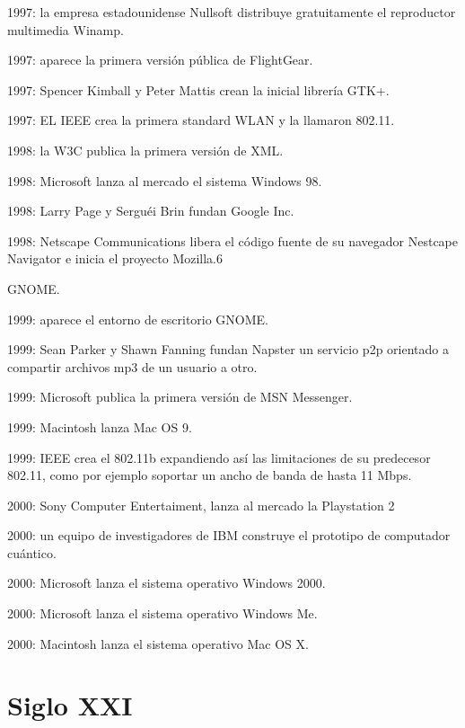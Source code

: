 \documentclass{article}
\begin{document}
{    \item 1997: la empresa estadounidense Nullsoft distribuye gratuitamente el reproductor multimedia Winamp.
    \item 1997: aparece la primera versión pública de FlightGear.
    \item 1997: Spencer Kimball y Peter Mattis crean la inicial librería GTK+.
    \item 1997: EL IEEE crea la primera standard WLAN y la llamaron 802.11.
    \item 1998: la W3C publica la primera versión de XML.
    \item 1998: Microsoft lanza al mercado el sistema Windows 98.
    \item 1998: Larry Page y Serguéi Brin fundan Google Inc.
    \item 1998: Netscape Communications libera el código fuente de su navegador Nestcape Navigator e inicia el proyecto Mozilla.6​

GNOME.

    \item 1999: aparece el entorno de escritorio GNOME.
    \item 1999: Sean Parker y Shawn Fanning fundan Napster un servicio p2p orientado a compartir archivos mp3 de un usuario a otro.
    \item 1999: Microsoft publica la primera versión de MSN Messenger.
    \item 1999: Macintosh lanza Mac OS 9.
    \item 1999: IEEE crea el 802.11b expandiendo así las limitaciones de su predecesor 802.11, como por ejemplo soportar un ancho de banda de hasta 11 Mbps.
    \item 2000: Sony Computer Entertaiment, lanza al mercado la Playstation 2
    \item 2000: un equipo de investigadores de IBM construye el prototipo de computador cuántico.
    \item 2000: Microsoft lanza el sistema operativo Windows 2000.
    \item 2000: Microsoft lanza el sistema operativo Windows Me.
    \item 2000: Macintosh lanza el sistema operativo Mac OS X.

}

\section{Siglo XXI}






\end{document}
